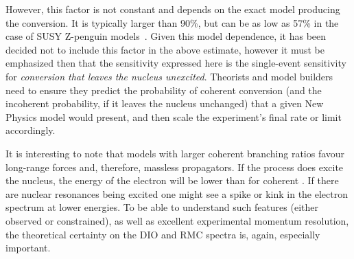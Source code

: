 However, this factor is not constant and depends on the exact model producing the conversion.  
It is typically larger than 90\%, but can be as low as 57\% in the case of SUSY Z-penguin models~\cite{Siiskonen:1999pj}.
Given this model dependence, it has been decided not to include this factor in the above estimate, however it must be emphasized then that the sensitivity expressed here is the single-event sensitivity for \emph{conversion that leaves the nucleus unexcited}.
Theorists and model builders need to ensure they predict the probability of coherent conversion (and the incoherent probability, if it leaves the nucleus unchanged) that a given New Physics model would present, and then scale the experiment's final rate or limit accordingly.

It is interesting to note that models with larger coherent branching ratios favour long-range forces and, therefore, massless propagators.
If the process does excite the nucleus, the energy of the electron will be lower than for coherent \mueconv.
If there are nuclear resonances being excited one might see a spike or kink in the electron spectrum at lower energies.
To be able to understand such features (either observed or constrained), as well as excellent experimental momentum resolution, the theoretical certainty on the \ac{DIO} and \ac{RMC} spectra is, again, especially important.
